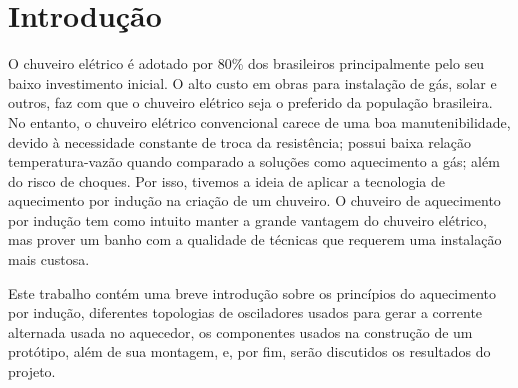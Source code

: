 \chapter*[Introdução]{Introdução}
O chuveiro elétrico é adotado por 80\% dos brasileiros principalmente pelo seu baixo investimento inicial. O alto custo em obras para instalação de gás, solar e outros, faz com que o chuveiro elétrico seja o preferido da população brasileira. No entanto, o chuveiro elétrico convencional carece de uma boa manutenibilidade, devido à necessidade constante de troca da resistência; possui baixa relação temperatura-vazão quando comparado a soluções como aquecimento a gás; além do risco de choques. Por isso, tivemos a ideia de aplicar a tecnologia de aquecimento por indução na criação de um chuveiro. O chuveiro de aquecimento por indução tem como intuito manter a grande vantagem do chuveiro elétrico, mas prover um banho com a qualidade de técnicas que requerem uma instalação mais custosa.

Este trabalho contém uma breve introdução sobre os princípios do aquecimento por indução, diferentes topologias de osciladores usados para gerar a corrente alternada usada no aquecedor, os componentes usados na construção de um protótipo, além de sua montagem, e, por fim, serão discutidos os resultados do projeto.